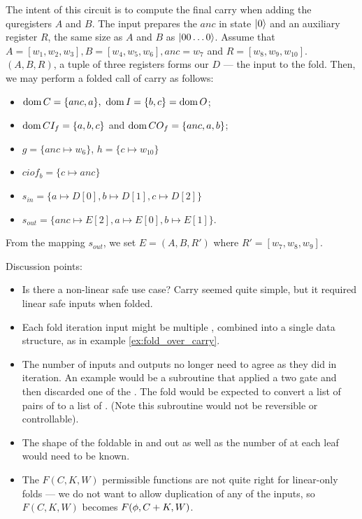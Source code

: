 The intent of this circuit is to compute the final carry when
adding the quregisters $A$ and $B$. The input prepares
the $anc$ in state $\left\vert{0}\right\rangle$ and an auxiliary register $R$,
the same size as $A$ and $B$ as $\left\vert{00\ldots0}\right\rangle$. Assume
that $A = [w_1,w_2,w_3], B=[w_4,w_5,w_6], anc=w_7$ and
$R=[w_8,w_9,w_{10}]$. $(A,B,R)$, a tuple of three registers
forms our $D$ --- the input to the fold. Then,
we may perform a folded call of carry as follows:
\begin{itemize}
  \item $\operatorname*{dom}{C} = \{anc,a\},\ \operatorname*{dom}{I} = \{b,c\} = \operatorname*{dom}{O}$;
  \item $\operatorname*{dom}{CI_f} = \{a,b,c\}$ and $\operatorname*{dom}{CO_f} = \{anc,a,b\}$;
  \item $g = \{anc \mapsto w_{6}\}$, $h=\{c\mapsto w_{10}\}$
  \item $ciof_b = \{c \mapsto anc \}$
  \item $s_{in} = \{a \mapsto D[0], b \mapsto D[1], c \mapsto D[2]\}$
  \item $s_{out} = \{anc \mapsto E[2], a \mapsto E[0], b \mapsto E[1]\}$.
\end{itemize}
From the mapping $s_{out}$, we set $E = (A,B,R')$ where $R'=[w_7,w_8,w_9]$.

Discussion points:
\begin{itemize}
  \item Is there a non-linear safe use case? Carry seemed quite simple,
    but it required linear safe inputs when folded.
  \item Each fold iteration input might be multiple ,
  combined into a single data structure, as in example
    \vref{ex:fold_over_carry}.
  \item The number of inputs and outputs no longer need
    to agree as they did in iteration.  An example would be a subroutine that
    applied a two \qubit gate and then discarded one of the \qubits.
    The fold would be expected to convert a list of pairs  of 
    to a list of . (Note this subroutine would not be reversible
    or controllable).
  \item The shape of the foldable in and out as well as the number of \qubits
    at each leaf would need to be known.
  \item The $F(C,K,W)$ permissible functions are not quite right for
    linear-only folds --- we do not want to allow duplication of any of
    the inputs, so $F(C,K,W)$ becomes $F(\phi,C+K,W)$.
\end{itemize}

